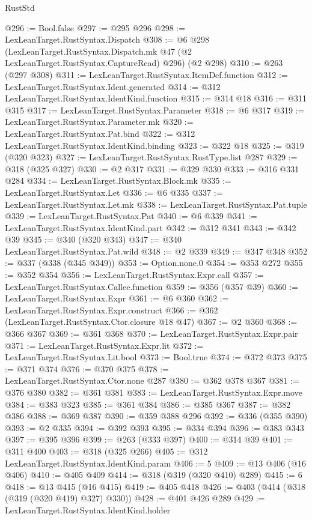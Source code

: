 \begin{lexlean}{RustStd}
\begin{coremodule}
@296 := Bool.false
@297 := @295 @296
@298 := LexLeanTarget.RustSyntax.Dispatch
@308 := @6
    @298
    (LexLeanTarget.RustSyntax.Dispatch.mk @47 (@2 LexLeanTarget.RustSyntax.CaptureRead) @296)
    (@2 @298)
@310 := @263 (@297 @308)
@311 := LexLeanTarget.RustSyntax.ItemDef.function
@312 := LexLeanTarget.RustSyntax.Ident.generated
@314 := @312 LexLeanTarget.RustSyntax.IdentKind.function
@315 := @314 @18
@316 := @311 @315
@317 := LexLeanTarget.RustSyntax.Parameter
@318 := @6 @317
@319 := LexLeanTarget.RustSyntax.Parameter.mk
@320 := LexLeanTarget.RustSyntax.Pat.bind
@322 := @312 LexLeanTarget.RustSyntax.IdentKind.binding
@323 := @322 @18
@325 := @319 (@320 @323)
@327 := LexLeanTarget.RustSyntax.RustType.list @287
@329 := @318 (@325 @327)
@330 := @2 @317
@331 := @329 @330
@333 := @316 @331 @284
@334 := LexLeanTarget.RustSyntax.Block.mk
@335 := LexLeanTarget.RustSyntax.Let
@336 := @6 @335
@337 := LexLeanTarget.RustSyntax.Let.mk
@338 := LexLeanTarget.RustSyntax.Pat.tuple
@339 := LexLeanTarget.RustSyntax.Pat
@340 := @6 @339
@341 := LexLeanTarget.RustSyntax.IdentKind.part
@342 := @312 @341
@343 := @342 @39
@345 := @340 (@320 @343)
@347 := @340 LexLeanTarget.RustSyntax.Pat.wild
@348 := @2 @339
@349 := @347 @348
@352 := @337 (@338 (@345 @349))
@353 := Option.none.{0}
@354 := @353 @272
@355 := @352 @354
@356 := LexLeanTarget.RustSyntax.Expr.call
@357 := LexLeanTarget.RustSyntax.Callee.function
@359 := @356 (@357 @39)
@360 := LexLeanTarget.RustSyntax.Expr
@361 := @6 @360
@362 := LexLeanTarget.RustSyntax.Expr.construct
@366 := @362 (LexLeanTarget.RustSyntax.Ctor.closure @18 @47)
@367 := @2 @360
@368 := @366 @367
@369 := @361 @368
@370 := LexLeanTarget.RustSyntax.Expr.pair
@371 := LexLeanTarget.RustSyntax.Expr.lit
@372 := LexLeanTarget.RustSyntax.Lit.bool
@373 := Bool.true
@374 := @372 @373
@375 := @371 @374
@376 := @370 @375
@378 := LexLeanTarget.RustSyntax.Ctor.none @287
@380 := @362 @378 @367
@381 := @376 @380
@382 := @361 @381
@383 := LexLeanTarget.RustSyntax.Expr.move
@384 := @383 @323
@385 := @361 @384
@386 := @385 @367
@387 := @382 @386
@388 := @369 @387
@390 := @359 @388 @296
@392 := @336 (@355 @390)
@393 := @2 @335
@394 := @392 @393
@395 := @334 @394
@396 := @383 @343
@397 := @395 @396
@399 := @263 (@333 @397)
@400 := @314 @39
@401 := @311 @400
@403 := @318 (@325 @266)
@405 := @312 LexLeanTarget.RustSyntax.IdentKind.param
@406 := 5
@409 := @13 @406 (@16 @406)
@410 := @405 @409
@414 := @318 (@319 (@320 @410) @289)
@415 := 6
@418 := @13 @415 (@16 @415)
@419 := @405 @418
@426 := @403 (@414 (@318 (@319 (@320 @419) @327) @330))
@428 := @401 @426 @289
@429 := LexLeanTarget.RustSyntax.IdentKind.holder

\end{coremodule}
\end{lexlean}
